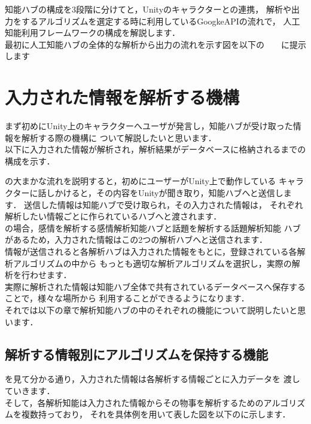 
知能ハブの構成を3段階に分けてと，Unityのキャラクターとの連携，
解析や出力をするアルゴリズムを選定する時に利用しているGoogkeAPIの流れで，
人工知能利用フレームワークの構成を解説します．
\\
最初に人工知能ハブの全体的な解析から出力の流れを示す図を以下の　　に提示します
\section{入力された情報を解析する機構}
まず初めにUnity上のキャラクターへユーザが発言し，知能ハブが受け取った情報を解析する際の機構に
ついて解説したいと思います．\\

以下に入力された情報が解析され，解析結果がデータベースに格納されるまでの
構成を示す．

の大まかな流れを説明すると，初めにユーザーがUnity上で動作している
キャラクターに話しかけると，その内容をUnityが聞き取り，知能ハブへと送信します．
送信した情報は知能ハブで受け取られ，その入力された情報は，
それぞれ解析したい情報ごとに作られているハブへと渡されます．\\
の場合，感情を解析する感情解析知能ハブと話題を解析する話題解析知能
ハブがあるため，入力された情報はこの2つの解析ハブへと送信されます．\\

情報が送信されると各解析ハブは入力された情報をもとに，登録されている各解析アルゴリズムの中から
もっとも適切な解析アルゴリズムを選択し，実際の解析を行わせます．\\

実際に解析された情報は知能ハブ全体で共有されているデータベースへ保存することで，様々な場所から
利用することができるようになります．\\

それでは以下の章で解析知能ハブの中のそれぞれの機能について説明したいと思います．


\subsection{解析する情報別にアルゴリズムを保持する機能}
を見て分かる通り，入力された情報は各解析する情報ごとに入力データを
渡していきます．\\
そして，各解析知能は入力された情報からその物事を解析するためのアルゴリズムを複数持っており，
それを具体例を用いて表した図を以下のに示します．

